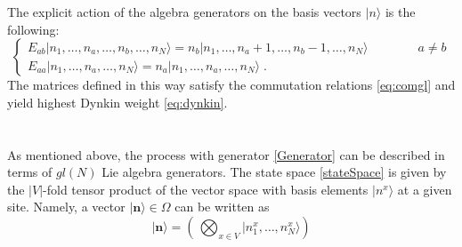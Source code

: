 \documentclass[10pt]{article}
\numberwithin{equation}{section}
\numberwithin{equation}{subsection}
\newcommand{\dt}{\;.}
\newcommand{\twoj}{\nu}
\begin{document}
The explicit action of the algebra generators on the basis  vectors $|n\rangle$ is the following:
\begin{equation}\label{actionE}
	\begin{cases}
		E_{ab}|n_{1},\ldots,n_{a},\ldots,n_{b},\ldots,n_{N}\rangle =n_{b}|n_{1},\ldots,n_{a}+1,\ldots,n_{b}-1,\ldots,n_{N}\rangle\qquad\qquad a\neq b\\[0.1cm]
		E_{aa}|n_{1},\ldots,n_{a},\ldots,n_{N}\rangle = n_{a} |n_{1},\ldots,n_{a},\ldots,n_{N}\rangle\dt
	\end{cases}
\end{equation}  
The matrices defined in this way satisfy the commutation relations \eqref{eq:comgl} and yield highest Dynkin weight \eqref{eq:dynkin}. \\
\\ \\
As mentioned above, the process with generator \eqref{Generator} can be described in terms of ${gl}(N)$ Lie algebra generators. The state space \eqref{stateSpace} is given by the $|V|$-fold tensor product of the vector space with basis elements $|n^x\rangle$ at a given site. Namely,
a vector $|{\bm{n}}\rangle \in \Omega$ can be written as
\begin{equation}
|{\bm{n}}\rangle=\left(\,\bigotimes_{x\in V}	|n_{1}^{x},\ldots,n_{N}^{x}\rangle\right)
\end{equation}
\end{document}

